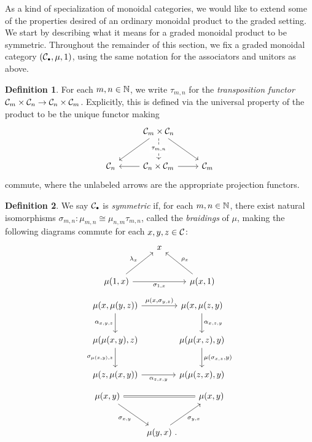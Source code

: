 \documentclass[openany, amssymb, psamsfonts]{amsart}
\theoremstyle{definition}
\newtheorem{defn}{Definition}[section]
\numberwithin{equation}{section}
\begin{document}
As a kind of specialization of monoidal categories, we would like to extend some of the properties desired of an ordinary monoidal product to the graded setting. We start by describing what it means for a graded monoidal product to be symmetric. Throughout the remainder of this section, we fix a graded monoidal category $(\C_\sbull, \mu, 1)$, using the same notation for the associators and unitors as above.

\begin{defn}
For each $m, n \in \mathbb{N}$, we write $\tau_{m, n}$ for the \emph{transposition functor} $\mathcal{C}_m \times \mathcal{C}_n \to \mathcal{C}_n \times \mathcal{C}_m$. Explicitly, this is defined via the universal property of the product to be the unique functor making
\begin{equation*}
    \begin{tikzcd}[row sep = 2.5em]
        & \C_m \times \C_n \ar[dl] \ar[dr] \ar[d, dashed, "\tau_{m, n}" {description}]\\
        \C_n & \C_n \times \C_m \ar[l] \ar[r] & \C_m
    \end{tikzcd}
\end{equation*}
commute, where the unlabeled arrows are the appropriate projection functors.
\end{defn}

\begin{defn} \label{def:symmetric_monoidal}
We say $\C_\smallbullet$ is \emph{symmetric} if, for each $m, n \in \mathbb{N}$, there exist natural isomorphisms $\sigma_{m, n} \colon \mu_{m, n} \cong \mu_{n, m} \tau_{m, n}$, called the \emph{braidings} of $\mu$, making the following diagrams commute for each $x, y, z \in \mathcal{C}$:
\begin{equation} \label{dgm:sym_unity}
    \begin{tikzcd}[row sep = 2.5em]
        & x\\
        \mu(1, x) \ar[ur, "{\lambda_x}"] \ar[rr, "{\sigma_{1, x}}"'] && \mu(x, 1) \ar[ul, "{\rho_x}"']
    \end{tikzcd}
\end{equation}
\begin{equation} \label{dgm:sym_assoc}
    \begin{tikzcd}[column sep = 4em, row sep = 2.3em]
        \mu(x, \mu(y, z)) \ar[r, "{\mu(x, \sigma_{y, z})}"] \ar[d, "{\alpha_{x, y, z}}"'] & \mu(x, \mu(z, y) \ar[d, "{\alpha_{x, z, y}}"]\\
        \mu(\mu(x, y), z) \ar[d, "{\sigma_{\mu(x, y), z}}"'] & \mu(\mu(x, z), y) \ar[d, "{\mu(\sigma_{x, z}, y)}"]\\
        \mu(z, \mu(x, y)) \ar[r, "{\alpha_{z, x, y}}"'] & \mu(\mu(z, x), y)
    \end{tikzcd}
\end{equation}
\begin{equation} \label{dgm:sym_involution}
    \begin{tikzcd}[row sep = 2.5em, column sep = 2.3em]
        \mu(x, y) \ar[dr, "{\sigma_{x, y}}"'] \ar[rr, equals] && \mu(x, y)\\
        & \mu(y, x) \period \ar[ur, "{\sigma_{y, x}}"']
    \end{tikzcd}
\end{equation}
\end{defn}
\end{document}
